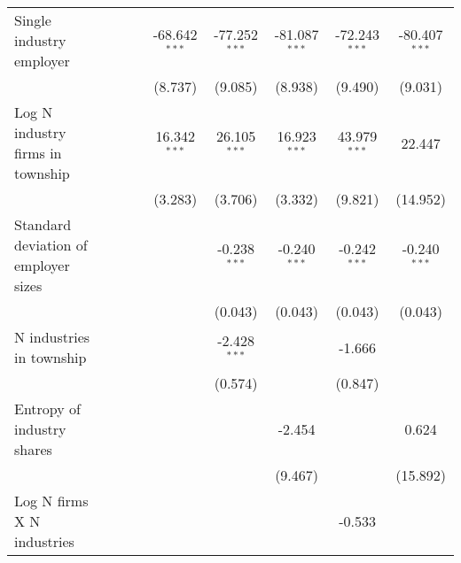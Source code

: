 \begin{tabular}{lcccccccc}
   Single industry employer                              &                &                 &                 & -68.642$^{***}$  & -77.252$^{***}$ & -81.087$^{***}$ & -72.243$^{***}$ & -80.407$^{***}$\\   
                                                         &                &                 &                 & (8.737)          & (9.085)         & (8.938)         & (9.490)         & (9.031)\\   
   Log N industry firms in township                      &                &                 &                 & 16.342$^{***}$   & 26.105$^{***}$  & 16.923$^{***}$  & 43.979$^{***}$  & 22.447\\   
                                                         &                &                 &                 & (3.283)          & (3.706)         & (3.332)         & (9.821)         & (14.952)\\   
   Standard deviation of employer sizes                  &                &                 &                 &                  & -0.238$^{***}$  & -0.240$^{***}$  & -0.242$^{***}$  & -0.240$^{***}$\\   
                                                         &                &                 &                 &                  & (0.043)         & (0.043)         & (0.043)         & (0.043)\\   
   N industries in township                              &                &                 &                 &                  & -2.428$^{***}$  &                 & -1.666          &   \\   
                                                         &                &                 &                 &                  & (0.574)         &                 & (0.847)         &   \\   
   Entropy of industry shares                            &                &                 &                 &                  &                 & -2.454          &                 & 0.624\\   
                                                         &                &                 &                 &                  &                 & (9.467)         &                 & (15.892)\\   
   Log N firms X N industries                            &                &                 &                 &                  &                 &                 & -0.533          &   \\   

\end{tabular}

